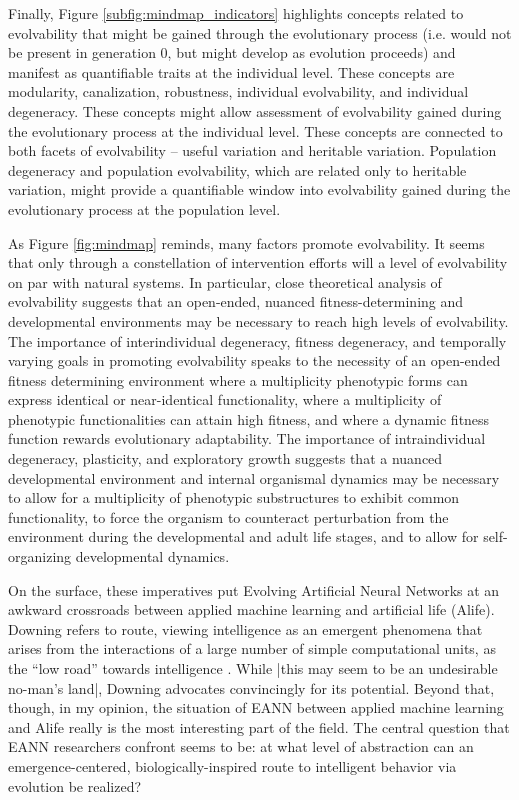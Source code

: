 Finally, Figure \ref{subfig:mindmap_indicators} highlights concepts related to evolvability that might be gained through the evolutionary process (i.e. would not be present in generation 0, but might develop as evolution proceeds) and manifest as quantifiable traits at the individual level. These concepts are modularity, canalization, robustness, individual evolvability, and individual degeneracy. These concepts might allow assessment of evolvability gained during the evolutionary process at the individual level. These concepts are connected to both facets of evolvability -- useful variation and heritable variation. Population degeneracy and population evolvability, which are related only to heritable variation, might provide a quantifiable window into evolvability gained during the evolutionary process at the population level.

As Figure \ref{fig:mindmap} reminds, many factors promote evolvability. It seems that only through a constellation of intervention efforts will a level of evolvability on par with natural systems. In particular, close theoretical analysis of evolvability suggests that an  open-ended, nuanced fitness-determining and developmental environments may be necessary to reach high levels of evolvability. The importance of interindividual degeneracy, fitness degeneracy, and temporally varying goals in promoting evolvability speaks to the necessity of an open-ended fitness determining environment where a multiplicity phenotypic forms can express identical or near-identical functionality, where a multiplicity of phenotypic functionalities can attain high fitness, and where a dynamic fitness function rewards evolutionary adaptability. The importance of intraindividual degeneracy, plasticity, and exploratory growth suggests that a nuanced developmental environment and internal organismal dynamics may be necessary to allow for a multiplicity of phenotypic substructures to exhibit common functionality, to force the organism to counteract perturbation from the environment during the developmental and adult life stages, and to allow for self-organizing developmental dynamics.

On the surface, these imperatives put Evolving Artificial Neural Networks at an awkward crossroads between applied machine learning and artificial life (Alife). Downing refers to route, viewing intelligence as an emergent phenomena that arises from the interactions of a large number of simple computational units, as the ``low road'' towards intelligence \cite[pg 19]{Downing2015IntelligenceSystems}.  While |this may seem to be an undesirable no-man's land|, Downing advocates convincingly for its potential. Beyond that, though, in my opinion, the situation of EANN between applied machine learning and Alife really is the most interesting part of the field. The central question that EANN researchers confront seems to be: at what level of abstraction can an emergence-centered, biologically-inspired route to intelligent behavior via evolution be realized? 

